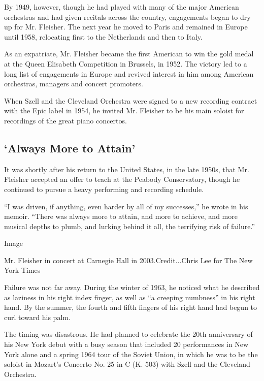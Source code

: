 By 1949, however, though he had played with many of the major American
orchestras and had given recitals across the country, engagements began
to dry up for Mr. Fleisher. The next year he moved to Paris and remained
in Europe until 1958, relocating first to the Netherlands and then to
Italy.

As an expatriate, Mr. Fleisher became the first American to win the gold
medal at the Queen Elisabeth Competition in Brussels, in 1952. The
victory led to a long list of engagements in Europe and revived interest
in him among American orchestras, managers and concert promoters.

When Szell and the Cleveland Orchestra were signed to a new recording
contract with the Epic label in 1954, he invited Mr. Fleisher to be his
main soloist for recordings of the great piano concertos.

\hypertarget{always-more-to-attain}{%
\subsection{`Always More to Attain'}\label{always-more-to-attain}}

It was shortly after his return to the United States, in the late 1950s,
that Mr. Fleisher accepted an offer to teach at the Peabody
Conservatory, though he continued to pursue a heavy performing and
recording schedule.

``I was driven, if anything, even harder by all of my successes,'' he
wrote in his memoir. ``There was always more to attain, and more to
achieve, and more musical depths to plumb, and lurking behind it all,
the terrifying risk of failure.''

Image

Mr. Fleisher in concert at Carnegie Hall in 2003.Credit...Chris Lee for
The New York Times

Failure was not far away. During the winter of 1963, he noticed what he
described as laziness in his right index finger, as well as ``a creeping
numbness'' in his right hand. By the summer, the fourth and fifth
fingers of his right hand had begun to curl toward his palm.

The timing was disastrous. He had planned to celebrate the 20th
anniversary of his New York debut with a busy season that included 20
performances in New York alone and a spring 1964 tour of the Soviet
Union, in which he was to be the soloist in Mozart's Concerto No. 25 in
C (K. 503) with Szell and the Cleveland Orchestra.

